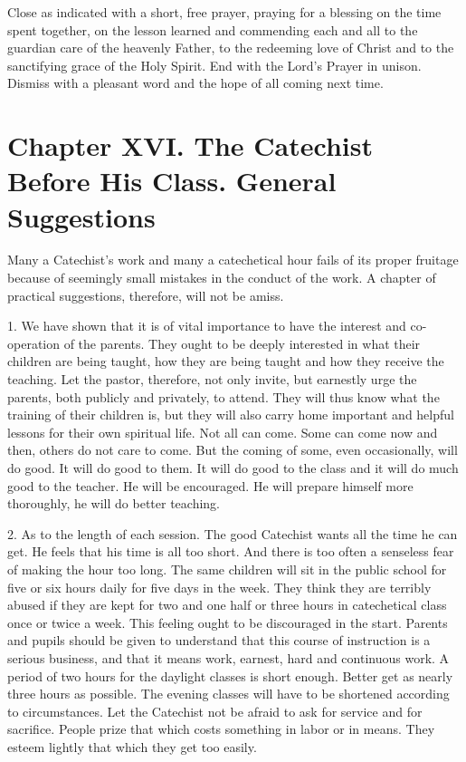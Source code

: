  Close as indicated with a short, free prayer, praying for a blessing on the time spent together, on the lesson learned and commending each and all to the guardian care of the heavenly Father, to the redeeming love of Christ and to the sanctifying grace of the Holy Spirit. End with the Lord’s Prayer in unison. Dismiss with a pleasant word and the hope of all coming next time.

\chapter[Chapter XVI. General Suggestions]{Chapter XVI. The Catechist Before His Class. General Suggestions}

Many a Catechist’s work and many a catechetical hour fails of its proper fruitage because of seemingly small mistakes in the conduct of the work. A chapter of practical suggestions, therefore, will not be amiss.

 1. We have shown that it is of vital importance to have the interest and co-operation of the parents. They ought to be deeply interested in what their children are being taught, how they are being taught and how they receive the teaching. Let the pastor, therefore, not only invite, but earnestly urge the parents, both publicly and privately, to attend. They will thus know what the training of their children is, but they will also carry home important and helpful lessons for their own spiritual life. Not all can come. Some can come now and then, others do not care to come. But the coming of some, even occasionally, will do good. It will do good to them. It will do good to the class and it will do much good to the teacher. He will be encouraged. He will prepare himself more thoroughly, he will do better teaching.

 2. As to the length of each session. The good Catechist wants all the time he can get. He feels that his time is all too short. And there is too often a senseless fear of making the hour too long. The same children will sit in the public school for five or six hours daily for five days in the week. They think they are terribly abused if they are kept for two and one half or three hours in catechetical class once or twice a week. This feeling ought to be discouraged in the start. Parents and pupils should be given to understand that this course of instruction is a serious business, and that it means work, earnest, hard and continuous work. A period of two hours for the daylight classes is short enough. Better get as nearly three hours as possible. The evening classes will have to be shortened according to circumstances. Let the Catechist not be afraid to ask for service and for sacrifice. People prize that which costs something in labor or in means. They esteem lightly that which they get too easily.

